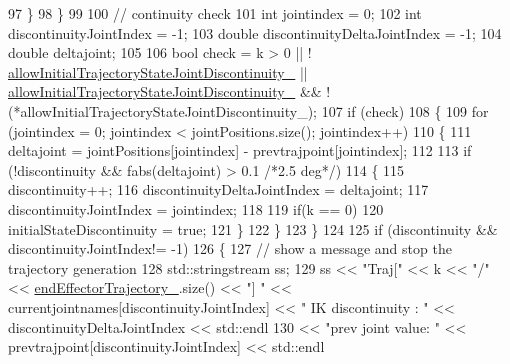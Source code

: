 \begin{DoxyCode}
97                     \}
98                 \}
99 
100                 \textcolor{comment}{// continuity check}
101                 \textcolor{keywordtype}{int} jointindex = 0;
102                 \textcolor{keywordtype}{int} discontinuityJointIndex = -1;
103                 \textcolor{keywordtype}{double} discontinuityDeltaJointIndex = -1;
104                 \textcolor{keywordtype}{double} deltajoint;
105 
106                 \textcolor{keywordtype}{bool} check = k > 0 || !
      \hyperlink{classcl__move__group__interface_1_1CbMoveEndEffectorTrajectory_a01e02533602d045538fd8ccc9a011ea7}{allowInitialTrajectoryStateJointDiscontinuity\_} || 
      \hyperlink{classcl__move__group__interface_1_1CbMoveEndEffectorTrajectory_a01e02533602d045538fd8ccc9a011ea7}{allowInitialTrajectoryStateJointDiscontinuity\_} && !
      (*allowInitialTrajectoryStateJointDiscontinuity\_);
107                 \textcolor{keywordflow}{if} (check)
108                 \{
109                     \textcolor{keywordflow}{for} (jointindex = 0; jointindex < jointPositions.size(); jointindex++)
110                     \{
111                         deltajoint = jointPositions[jointindex] - prevtrajpoint[jointindex];
112 
113                         \textcolor{keywordflow}{if} (!discontinuity && fabs(deltajoint) > 0.1 \textcolor{comment}{/*2.5 deg*/})
114                         \{
115                             discontinuity++;
116                             discontinuityDeltaJointIndex = deltajoint;
117                             discontinuityJointIndex = jointindex;
118                             
119                             \textcolor{keywordflow}{if}(k == 0)
120                                 initialStateDiscontinuity = \textcolor{keyword}{true};
121                         \}
122                     \}
123                 \}
124 
125                 \textcolor{keywordflow}{if} (discontinuity && discontinuityJointIndex!= -1)
126                 \{
127                     \textcolor{comment}{// show a message and stop the trajectory generation}
128                     std::stringstream ss;
129                     ss << \textcolor{stringliteral}{"Traj["} << k << \textcolor{stringliteral}{"/"} << \hyperlink{classcl__move__group__interface_1_1CbMoveEndEffectorTrajectory_ae13dfd31ea3660646e03882f0c2c29f0}{endEffectorTrajectory\_}.size() << \textcolor{stringliteral}{"] 
      "} << currentjointnames[discontinuityJointIndex] << \textcolor{stringliteral}{" IK discontinuity : "} << discontinuityDeltaJointIndex <<
       std::endl
130                        << \textcolor{stringliteral}{"prev joint value: "} << prevtrajpoint[discontinuityJointIndex] << std::endl

\end{DoxyCode}
